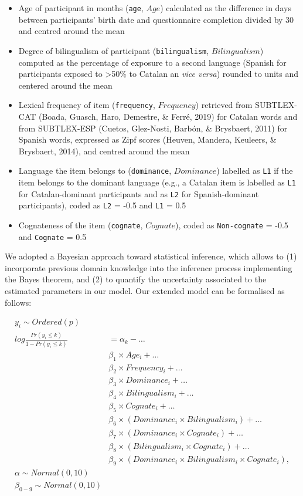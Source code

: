 \documentclass[
  english,
  man,man,floatsintext]{apa6}
\providecommand{\tightlist}{%
  \setlength{\itemsep}{0pt}\setlength{\parskip}{0pt}}
\begin{document}
\begin{itemize}
\tightlist
\item
  Age of participant in months (\texttt{age}, \(Age\)) calculated as the difference in days between participants' birth date and questionnaire completion divided by 30 and centred around the mean
\item
  Degree of bilingualism of participant (\texttt{bilingualism}, \(Bilingualism\)) computed as the percentage of exposure to a second language (Spanish for participants exposed to \textgreater50\% to Catalan an \emph{vice versa}) rounded to units and centered around the mean
\item
  Lexical frequency of item (\texttt{frequency}, \(Frequency\)) retrieved from SUBTLEX-CAT (Boada, Guasch, Haro, Demestre, \& Ferré, 2019) for Catalan words and from SUBTLEX-ESP (Cuetos, Glez-Nosti, Barbón, \& Brysbaert, 2011) for Spanish words, expressed as Zipf scores (Heuven, Mandera, Keuleers, \& Brysbaert, 2014), and centred around the mean
\item
  Language the item belongs to (\texttt{dominance}, \(Dominance\)) labelled as \texttt{L1} if the item belongs to the dominant language (e.g., a Catalan item is labelled as \texttt{L1} for Catalan-dominant participants and as \texttt{L2} for Spanish-dominant participants), coded as \texttt{L2} = -0.5 and \texttt{L1} = 0.5
\item
  Cognateness of the item (\texttt{cognate}, \(Cognate\)), coded as \texttt{Non-cognate} = -0.5 and \texttt{Cognate} = 0.5
\end{itemize}

We adopted a Bayesian approach toward statistical inference, which allows to (1) incorporate previous domain knowledge into the inference process implementing the Bayes theorem, and (2) to quantify the uncertainty associated to the estimated parameters in our model. Our extended model can be formalised as follows:

\[
\begin{aligned}
y_i \sim Ordered(p) \\
log\frac{Pr(y_i \leq k)}{1-Pr(y_i \leq k)} &= \alpha_k - \dots \\
& \beta_1 \times Age_i + \dots \\
& \beta_2 \times Frequency_i + \dots \\
& \beta_3 \times Dominance_i + \dots \\
& \beta_4 \times Bilingualism_i + \dots \\
& \beta_5 \times Cognate_i + \dots \\
& \beta_6 \times (Dominance_i \times Bilingualism_i) + \dots \\
& \beta_7 \times (Dominance_i \times Cognate_i) + \dots \\
& \beta_8 \times (Bilingualism_i \times Cognate_i) + \dots \\
& \beta_9 \times (Dominance_i \times Bilingualism_i \times Cognate_i), \\
\alpha \sim Normal(0, 10) \\
\beta_{0-9} \sim Normal(0, 10)
\end{aligned}
\]
\end{document}
